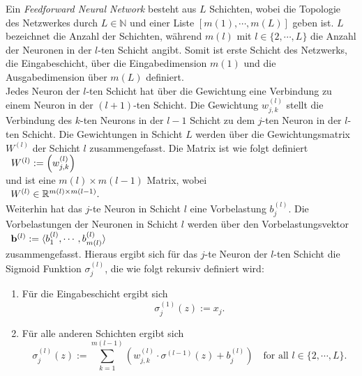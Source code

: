 \noindent
Ein \textit{Feedforward Neural Network} besteht aus $L$ Schichten, wobei die Topologie des Netzwerkes durch $L \in \mathbb{N}$ und einer Liste $[m(1),\cdots ,m(L)]$ geben ist. $L$ bezeichnet die Anzahl der Schichten, während $m(l)$ mit $l \in \{2,\cdots ,L\}$ die Anzahl der Neuronen in der $l$-ten Schicht angibt. Somit ist erste Schicht des Netzwerks, die Eingabeschicht, über die Eingabedimension $m(1)$ und die Ausgabedimension über $m(L)$ definiert. \\
Jedes Neuron der $l$-ten Schicht hat über die Gewichtung eine Verbindung zu einem Neuron in der $(l+1)$-ten Schicht. Die Gewichtung $w_{j,k}^{(l)}$ stellt die Verbindung des $k$-ten Neurons in der $l-1$ Schicht zu dem $j$-ten Neuron in der $l$-ten Schicht. Die Gewichtungen in Schicht $L$ werden über die Gewichtungsmatrix $W^{(l)}$ der Schicht $l$ zusammengefasst. Die Matrix ist wie folgt definiert \\[0.2cm]
\hspace*{1.3cm}
$
\begin{array}[t]{lclll}
	W^{(l)} := \left( w_{j,k}^{(l)}\right)
\end{array}
$
\\[0.2cm]
und ist eine $m(l)\times m(l-1)$ Matrix, wobei \\[0.2cm]
\hspace*{1.3cm}
$
\begin{array}[t]{lclll}
	W^{(l)} \in \mathbb{R}^{m(l)\times m(l-1)}.
\end{array}
$
\\[0.2cm]
Weiterhin hat das $j$-te Neuron in Schicht $l$ eine Vorbelastung $b_j^{(l)}$. Die Vorbelastungen der Neuronen in Schicht $l$ werden über den Vorbelastungsvektor \\[0.2cm]
\hspace*{1.3cm}
$
\begin{array}[t]{lclll}
	\mathbf{b}^{(l)} := \langle b_1^{(l)},\cdots ,b_{m(l)}^{(l)}\rangle
\end{array}
$
\\[0.2cm]
zusammengefasst. Hieraus ergibt sich für das $j$-te Neuron der $l$-ten Schicht die Sigmoid Funktion $\sigma_j^{(l)}$, die wie folgt rekursiv definiert wird:
\begin{enumerate}
	\item Für die Eingabeschicht ergibt sich 
			\begin{equation}
        	\label{eq:feedforward1}
      			 \sigma_j^{(1)}(z) := x_j.
     		\end{equation}
    \item Für alle anderen Schichten ergibt sich
    		\begin{equation}
         	\label{eq:feedforward2}
         		\sigma_j^{(l)}(z) := 
             	\sum\limits_{k=1}^{m(l-1)} \left(w_{j,k}^{(l)}\cdot \sigma^{(l-1)}(z) + b_{j}^{(l)}\right) \quad \mbox{for all $l \in \{2, \cdots, L\}$}.
			\end{equation}
\end{enumerate}
